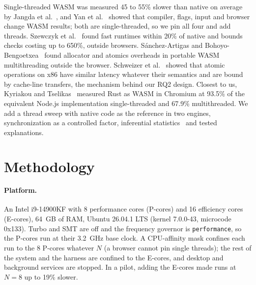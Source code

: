 \documentclass[sigplan]{acmart}
\begin{document}
Single-threaded WASM was measured 45 to 55\% slower than native on average
by Jangda et al.~\cite{jangda2019}, and Yan et al.~\cite{yan2021} showed
that compiler, flags, input and browser change WASM results; both are
single-threaded, so we pin all four and add threads. Szewczyk et
al.~\cite{szewczyk2022} found fast runtimes within 20\% of native and
bounds checks costing up to 650\%, outside browsers. S{\'a}nchez-Artigas
and Bohoyo-Bengoetxea~\cite{sanchez2025} found allocator and atomics
overheads in portable WASM multithreading outside the browser. Schweizer et
al.~\cite{schweizer2015} showed that atomic operations on x86 have similar
latency whatever their semantics and are bound by cache-line transfers, the
mechanism behind our RQ2 design. Closest to us, Kyriakou and
Tselikas~\cite{kyriakou2022} measured Rust as WASM in Chromium at 93.5\% of
the equivalent Node.js implementation single-threaded and 67.9\%
multithreaded. We add a thread sweep with native code as the reference in
two engines, synchronization as a controlled factor, inferential
statistics~\cite{georges2007,hoefler2015} and tested explanations.

\section{Methodology}

\paragraph{Platform.} An Intel i9-14900KF with 8 performance cores
(P-cores) and 16 efficiency cores (E-cores), 64~GB of RAM, Ubuntu 26.04.1
LTS (kernel 7.0.0-43, microcode 0x133). Turbo and SMT are off and the
frequency governor is \texttt{performance}, so the P-cores run at their
3.2~GHz base clock. A CPU-affinity mask confines each run to the 8 P-cores
whatever $N$ (a browser cannot pin single threads); the rest of the system
and the harness are confined to the E-cores, and desktop and background
services are stopped. In a pilot, adding the E-cores made runs at $N=8$ up
to 19\% slower.
\end{document}
